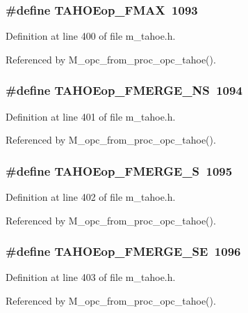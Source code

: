 \subsubsection{\setlength{\rightskip}{0pt plus 5cm}\#define TAHOEop\_\-FMAX~1093}\label{m__tahoe_8h_d01addb8748c8a25ddd4c55dea723fb0}




Definition at line 400 of file m\_\-tahoe.h.

Referenced by M\_\-opc\_\-from\_\-proc\_\-opc\_\-tahoe().
\subsubsection{\setlength{\rightskip}{0pt plus 5cm}\#define TAHOEop\_\-FMERGE\_\-NS~1094}\label{m__tahoe_8h_5bd5632da2ad4190aacb96a306ac0fcc}




Definition at line 401 of file m\_\-tahoe.h.

Referenced by M\_\-opc\_\-from\_\-proc\_\-opc\_\-tahoe().
\subsubsection{\setlength{\rightskip}{0pt plus 5cm}\#define TAHOEop\_\-FMERGE\_\-S~1095}\label{m__tahoe_8h_51b261fd06738094f095c22889c13a2b}




Definition at line 402 of file m\_\-tahoe.h.

Referenced by M\_\-opc\_\-from\_\-proc\_\-opc\_\-tahoe().
\subsubsection{\setlength{\rightskip}{0pt plus 5cm}\#define TAHOEop\_\-FMERGE\_\-SE~1096}\label{m__tahoe_8h_9b576ce303cd65a76bc0296213fb4db7}




Definition at line 403 of file m\_\-tahoe.h.

Referenced by M\_\-opc\_\-from\_\-proc\_\-opc\_\-tahoe().
